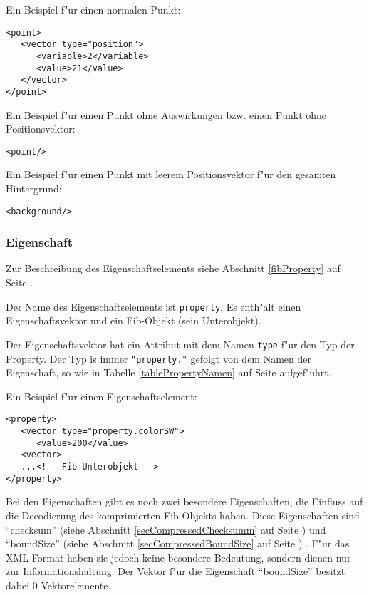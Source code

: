 \bigskip\noindent
Ein Beispiel f"ur einen normalen Punkt:
\begin{verbatim}
<point>
   <vector type="position">
      <variable>2</variable>
      <value>21</value>
   </vector>
</point>
\end{verbatim}

\bigskip\noindent
Ein Beispiel f"ur einen Punkt ohne Auswirkungen bzw. einen Punkt ohne Positionsvektor:
\begin{verbatim}
<point/>
\end{verbatim}

\bigskip\noindent
Ein Beispiel f"ur einen Punkt mit leerem Positionsvektor f"ur den gesamten Hintergrund:
\begin{verbatim}
<background/>
\end{verbatim}



\subsubsection{Eigenschaft}
\label{secXmlProperty}

Zur Beschreibung des Eigenschaftselements siehe Abschnitt \ref{fibProperty} auf Seite \pageref{fibProperty} .

Der Name des Eigenschaftselements ist \verb|property|. Es enth"alt einen Eigenschaftsvektor und ein Fib-Objekt (sein Unterobjekt).

Der Eigenschaftsvektor hat ein Attribut mit dem Namen \verb|type| f"ur den Typ der Property.  Der Typ is immer \verb|"property."| gefolgt von dem Namen der Eigenschaft, so wie in Tabelle \ref{tablePropertyNamen} auf Seite \pageref{tablePropertyNamen} aufgef"uhrt.

\bigskip\noindent
Ein Beispiel f"ur einen Eigenschaftselement:
\begin{verbatim}
<property>
   <vector type="property.colorSW">
      <value>200</value>
   <vector>
   ...<!-- Fib-Unterobjekt -->
</property>
\end{verbatim}


\bigskip\noindent
Bei den Eigenschaften gibt es noch zwei besondere Eigenschaften, die Einfluss auf die Decodierung des komprimierten Fib-Objekts haben. Diese Eigenschaften sind ``checksum'' (siehe Abschnitt \ref{secCompressedChecksumm} auf Seite \pageref{secCompressedChecksumm}) und ``boundSize'' (siehe Abschnitt \ref{secCompressedBoundSize} auf Seite \pageref{secCompressedBoundSize}) . F"ur das XML-Format haben sie jedoch keine besondere Bedeutung, sondern dienen nur zur Informationshaltung. Der Vektor f"ur die Eigenschaft ``boundSize'' besitzt dabei $0$ Vektorelemente.

